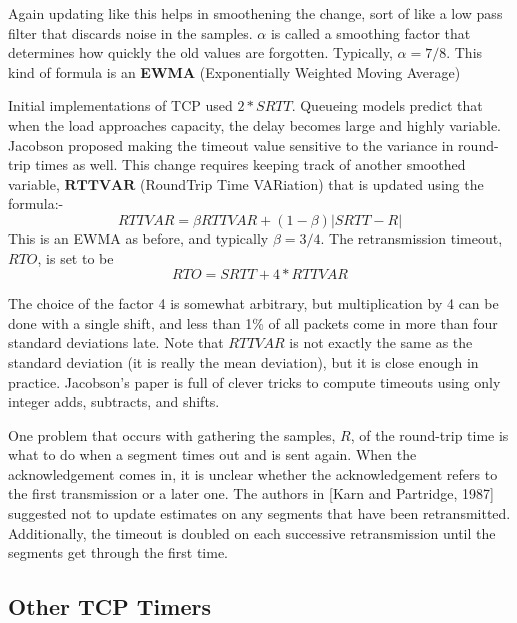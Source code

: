 \documentclass[twoside]{article}
\begin{document}
Again updating like this helps in smoothening the change, sort of like a low pass filter that discards noise in the samples. $\alpha$ is called a smoothing factor that determines how quickly the old values are forgotten. Typically, $\alpha = 7/8$. This kind of formula is an \textbf{EWMA} (Exponentially Weighted Moving Average)

Initial implementations of TCP used $2 * SRTT$. Queueing models predict that when the load approaches capacity, the delay becomes large and highly variable. Jacobson proposed making the timeout value sensitive to the variance in round-trip times as well. This change requires keeping track of another smoothed variable, $\mathbf{RTTVAR}$ (RoundTrip Time VARiation) that is updated using the formula:- $$RTTVAR = \beta RTTVAR + (1 - \beta)|SRTT - R|$$ This is an EWMA as before, and typically $\beta = 3/4$. The retransmission timeout, $RTO$, is set to be $$RTO = SRTT + 4 * RTTVAR$$

The choice of the factor 4 is somewhat arbitrary, but multiplication by 4 can be done with a single shift, and less than 1\% of all packets come in more than four standard deviations late. Note that $RTTVAR$ is not exactly the same as the standard deviation (it is really the mean deviation), but it is close enough in practice. Jacobson’s paper is full of clever tricks to compute timeouts using only integer adds, subtracts, and shifts.

One problem that occurs with gathering the samples, $R$, of the round-trip time is what to do when a segment times out and is sent again. When the acknowledgement comes in, it is unclear whether the acknowledgement refers to the first transmission or a later one. The authors in [Karn and Partridge, 1987] suggested not to update estimates on any segments that have been retransmitted. Additionally, the timeout is doubled on each successive retransmission until the segments get through the first time.

\subsection{Other TCP Timers}
\end{document}

